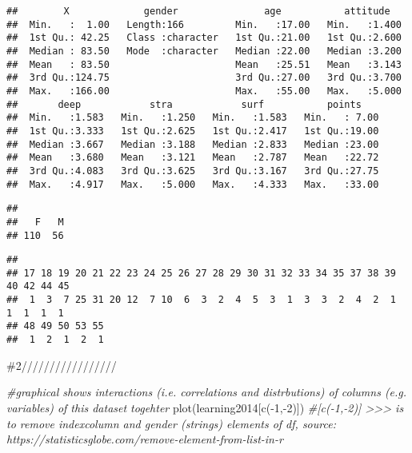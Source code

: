 \documentclass[
]{article}
\newenvironment{Shaded}{\begin{snugshade}}{\end{snugshade}}
\newcommand{\CommentTok}[1]{\textcolor[rgb]{0.56,0.35,0.01}{\textit{#1}}}
\newcommand{\DecValTok}[1]{\textcolor[rgb]{0.00,0.00,0.81}{#1}}
\newcommand{\FunctionTok}[1]{\textcolor[rgb]{0.00,0.00,0.00}{#1}}
\newcommand{\NormalTok}[1]{#1}
\newcommand{\SpecialCharTok}[1]{\textcolor[rgb]{0.00,0.00,0.00}{#1}}
\begin{document}
\begin{verbatim}
##        X             gender               age           attitude    
##  Min.   :  1.00   Length:166         Min.   :17.00   Min.   :1.400  
##  1st Qu.: 42.25   Class :character   1st Qu.:21.00   1st Qu.:2.600  
##  Median : 83.50   Mode  :character   Median :22.00   Median :3.200  
##  Mean   : 83.50                      Mean   :25.51   Mean   :3.143  
##  3rd Qu.:124.75                      3rd Qu.:27.00   3rd Qu.:3.700  
##  Max.   :166.00                      Max.   :55.00   Max.   :5.000  
##       deep            stra            surf           points     
##  Min.   :1.583   Min.   :1.250   Min.   :1.583   Min.   : 7.00  
##  1st Qu.:3.333   1st Qu.:2.625   1st Qu.:2.417   1st Qu.:19.00  
##  Median :3.667   Median :3.188   Median :2.833   Median :23.00  
##  Mean   :3.680   Mean   :3.121   Mean   :2.787   Mean   :22.72  
##  3rd Qu.:4.083   3rd Qu.:3.625   3rd Qu.:3.167   3rd Qu.:27.75  
##  Max.   :4.917   Max.   :5.000   Max.   :4.333   Max.   :33.00
\end{verbatim}

\begin{Shaded}
\end{Shaded}

\begin{verbatim}
## 
##   F   M 
## 110  56
\end{verbatim}

\begin{Shaded}
\end{Shaded}

\begin{verbatim}
## 
## 17 18 19 20 21 22 23 24 25 26 27 28 29 30 31 32 33 34 35 37 38 39 40 42 44 45 
##  1  3  7 25 31 20 12  7 10  6  3  2  4  5  3  1  3  3  2  4  2  1  1  1  1  1 
## 48 49 50 53 55 
##  1  2  1  2  1
\end{verbatim}

\#2/////////////////

\begin{Shaded}
\begin{Highlighting}[]
\CommentTok{\#graphical shows interactions (i.e. correlations and distrbutions) of columns (e.g. variables) of this dataset togehter}
\FunctionTok{plot}\NormalTok{(learning2014[}\FunctionTok{c}\NormalTok{(}\SpecialCharTok{{-}}\DecValTok{1}\NormalTok{,}\SpecialCharTok{{-}}\DecValTok{2}\NormalTok{)]) }\CommentTok{\#[c({-}1,{-}2)] \textgreater{}\textgreater{}\textgreater{} is to remove indexcolumn and gender (strings) elements of df, source: https://statisticsglobe.com/remove{-}element{-}from{-}list{-}in{-}r}
\end{Highlighting}
\end{Shaded}
\end{document}
